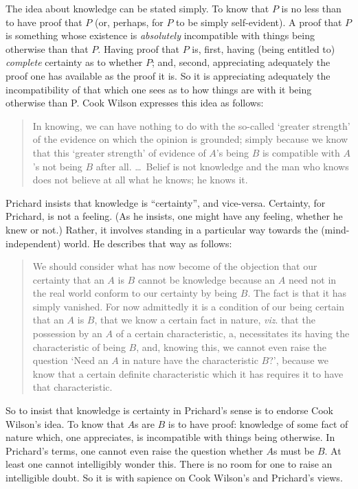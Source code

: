 The idea about knowledge can be stated simply. To know that \( P \) is no less than to have proof that \( P \) (or, perhaps, for \( P \) to be simply self-evident). A proof that \( P \) is something whose existence is \emph{absolutely} incompatible with things being otherwise than that \( P \). Having proof that \( P \) is, first, having (being entitled to) \emph{complete} certainty as to whether \( P \); and, second, appreciating adequately the proof one has available as the proof it is. So it is appreciating adequately the incompatibility of that which one sees as to how things are with it being otherwise than P. Cook Wilson expresses this idea as follows:
\begin{quote}
	In knowing, we can have nothing to do with the so-called `greater strength' of the evidence on which the opinion is grounded; simply because we know that this `greater strength' of evidence of \( A \)'s being \( B \) is compatible with \( A \)'s not being \( B \) after all. \ldots\ Belief is not knowledge and the man who knows does not believe at all what he knows; he knows it. \citep[100]{Cook-Wilson:1926sf}
\end{quote}
Prichard insists that knowledge is ``certainty'', and vice-versa. Certainty, for Prichard, is not a feeling. (As he insists, one might have any feeling, whether he knew or not.) Rather, it involves standing in a particular way towards the (mind-independent) world. He describes that way as follows:
\begin{quote}
	We should consider what has now become of the objection that our certainty that an \( A \) is \( B \) cannot be knowledge because an \( A \) need not in the real world conform to our certainty by being \( B \). The fact is that it has simply vanished. For now admittedly it is a condition of our being certain that an \( A \) is \( B \), that we know a certain fact in nature, \emph{viz}. that the possession by an \( A \) of a certain characteristic, a, necessitates its having the characteristic of being \( B \), and, knowing this, we cannot even raise the question `Need an \( A \) in nature have the characteristic \( B \)?', because we know that a certain definite characteristic which it has requires it to have that characteristic. \citep[103--104]{Prichard:1950tg}
\end{quote}
So to insist that knowledge is certainty in Prichard's sense is to endorse Cook Wilson's idea. To know that \( A \)s are \( B \) is to have proof: knowledge of some fact of nature which, one appreciates, is incompatible with things being otherwise. In Prichard's terms, one cannot even raise the question whether \( A \)s must be \( B \). At least one cannot intelligibly wonder this. There is no room for one to raise an intelligible doubt. So it is with sapience on Cook Wilson’s and Prichard's views.

